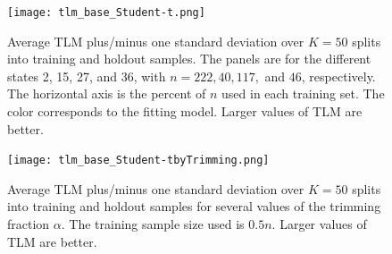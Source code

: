 \documentclass[ba]{imsart}
\newcommand{\by}{\mbox{\boldmath $y$}}
\begin{document}

\begin{figure}[t]
\centering
\texttt{[image: tlm\_base\_Student-t.png]}
\caption{Average TLM plus/minus one standard deviation over $K = 50$ splits into training and holdout samples. The panels are for the different states  2, 15, 27, and 36, with $n = 222, 40, 117,$ and $46$, respectively. The horizontal axis is the percent of $n$ used in each training set. The color corresponds to the fitting model.  Larger values of TLM are better.}
\label{fig:tlm}
\end{figure}

\begin{figure}[t]
\centering
\texttt{[image: tlm\_base\_Student-tbyTrimming.png]}
\caption{Average TLM plus/minus one standard deviation over $K = 50$ splits into training and holdout samples for several values of the trimming fraction $\alpha$. The training sample size used is $0.5n$.  Larger values of TLM are better.}
\label{fig:tlmbyAlpha}
\end{figure}

%
\end{document}
